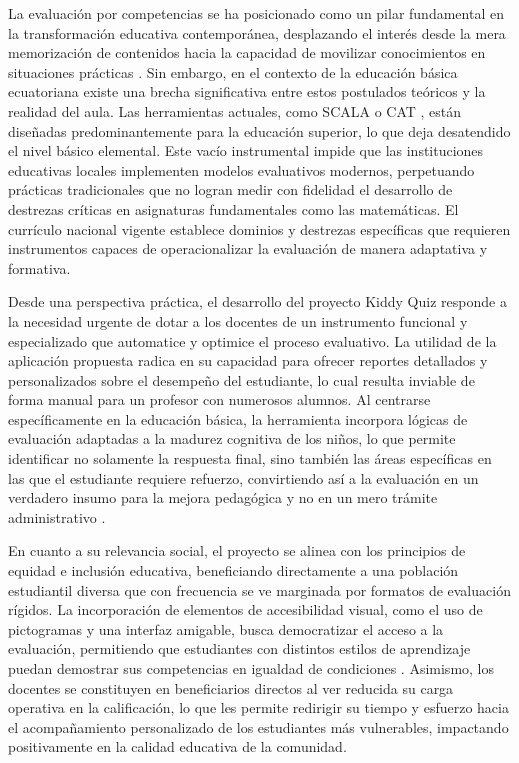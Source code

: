 La evaluación por competencias se ha posicionado como un pilar fundamental en la transformación educativa contemporánea, desplazando el interés desde la mera memorización de contenidos hacia la capacidad de movilizar conocimientos en situaciones prácticas \cite{ref01_evalcompetencias,ref33_cano}. Sin embargo, en el contexto de la educación básica ecuatoriana existe una brecha significativa entre estos postulados teóricos y la realidad del aula. Las herramientas actuales, como SCALA \cite{ref21_scala_universidad} o CAT \cite{ref10_cat}, están diseñadas predominantemente para la educación superior, lo que deja desatendido el nivel básico elemental. Este vacío instrumental impide que las instituciones educativas locales implementen modelos evaluativos modernos, perpetuando prácticas tradicionales que no logran medir con fidelidad el desarrollo de destrezas críticas en asignaturas fundamentales como las matemáticas. El currículo nacional vigente \cite{ref29_curriculo_ec} establece dominios y destrezas específicas que requieren instrumentos capaces de operacionalizar la evaluación de manera adaptativa y formativa.

Desde una perspectiva práctica, el desarrollo del proyecto Kiddy Quiz responde a la necesidad urgente de dotar a los docentes de un instrumento funcional y especializado que automatice y optimice el proceso evaluativo. La utilidad de la aplicación propuesta radica en su capacidad para ofrecer reportes detallados y personalizados sobre el desempeño del estudiante, lo cual resulta inviable de forma manual para un profesor con numerosos alumnos. Al centrarse específicamente en la educación básica, la herramienta incorpora lógicas de evaluación adaptadas a la madurez cognitiva de los niños, lo que permite identificar no solamente la respuesta final, sino también las áreas específicas en las que el estudiante requiere refuerzo, convirtiendo así a la evaluación en un verdadero insumo para la mejora pedagógica y no en un mero trámite administrativo \cite{ref27_blackwiliam}.

En cuanto a su relevancia social, el proyecto se alinea con los principios de equidad e inclusión educativa, beneficiando directamente a una población estudiantil diversa que con frecuencia se ve marginada por formatos de evaluación rígidos. La incorporación de elementos de accesibilidad visual, como el uso de pictogramas y una interfaz amigable, busca democratizar el acceso a la evaluación, permitiendo que estudiantes con distintos estilos de aprendizaje puedan demostrar sus competencias en igualdad de condiciones \cite{ref42_cabero,ref48_nielsen}. Asimismo, los docentes se constituyen en beneficiarios directos al ver reducida su carga operativa en la calificación, lo que les permite redirigir su tiempo y esfuerzo hacia el acompañamiento personalizado de los estudiantes más vulnerables, impactando positivamente en la calidad educativa de la comunidad.


